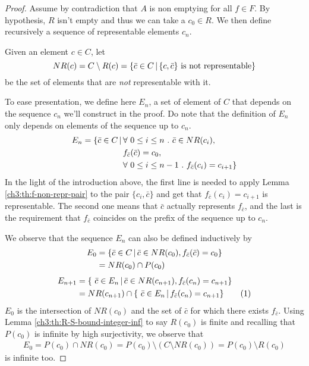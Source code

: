 \begin{proof}
	Assume by contradiction that $A$ is non emptying for all $f \in F$. By hypothesis, $R$ isn't empty and thus we can take a $c_0 \in R$. We then define recursively a sequence of representable elements $c_n$.

	Given an element $c \in C$, let
	\[
	NR(c) = C \setminus R(c) = \{ \bar{c} \in C \,\vert\, \{ c, \bar{c} \} \text{ is not representable} \}
	\]
	be the set of elements that are \textit{not} representable with it.

	To ease presentation, we define here $E_n$, a set of element of $C$ that depends on the sequence $c_n$ we'll construct in the proof. Do note that the definition of $E_n$ only depends on elements of the sequence up to $c_n$.
	\begin{align*}
		E_n = \{\bar{c} \in C \svert & \forall\ 0 \le i \le n \ .\ \bar{c} \in NR(c_i), \\
		& f_{\bar{c}}(\bar{c}) = c_0, \\
		& \forall\ 0 \le i \le n - 1 \ .\ f_{\bar{c}}(c_i) = c_{i + 1} \}
	\end{align*}
	In the light of the introduction above, the first line is needed to apply Lemma \ref{ch3:th:f-non-repr-pair} to the pair $\{ c_i, \bar{c} \}$ and get that $f_{\bar{c}}(c_i) = c_{i+1}$ is representable. The second one means that $\bar{c}$ actually represents $f_{\bar{c}}$, and the last is the requirement that $f_{\bar{c}}$ coincides on the prefix of the sequence up to $c_n$.

	We observe that the sequence $E_n$ can also be defined inductively by
	\begin{align*}
		E_0 &= \{ \bar{c} \in C \,\vert\, \bar{c} \in NR(c_0), f_{\bar{c}}(\bar{c}) = c_0 \} \\
		&= NR(c_0) \cap P(c_0)
	\end{align*}
	\begin{align*}
		E_{n+1} &= \{\ \bar{c} \in E_n \svert \bar{c} \in NR(c_{n+1}), f_{\bar{c}}(c_n) = c_{n+1} \} \\
		&= NR(c_{n+1}) \cap \{\ \bar{c} \in E_n \svert f_{\bar{c}}(c_n) = c_{n+1} \} \addtocounter{equation}{1}\tag{\theequation} \label{ch4:eq:En-relation}
	\end{align*}
	$E_0$ is the intersection of $NR(c_0)$ and the set of $\bar{c}$ for which there exists $f_{\bar{c}}$. Using Lemma \ref{ch3:th:R-S-bound-integer-inf} to say $R(c_0)$ is finite and recalling that $P(c_0)$ is infinite by high surjectivity, we observe that
	\begin{align*}
		E_0 = P(c_0) \cap NR(c_0) = P(c_0) \setminus (C \setminus NR(c_0)) = P(c_0) \setminus R(c_0)
	\end{align*}
	is infinite too.


\end{proof}
